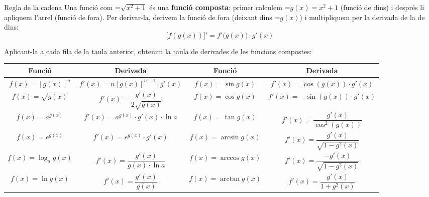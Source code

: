 \documentclass[11pt,a4paper]{article}
\newcommand{\fmm}[1]{\setbox0=\hbox{$#1$}\ifdim\wd0>\linewidth\[#1\]\else\mbox{\box0}\fi}
\begin{document}
  
\begin{fmdef}{Regla de la cadena}
Una funció com \fmm{\sqrt{x^2+1}} és una \textbf{funció composta}: primer calculem \fmm{g(x)=x^2+1} (funció de dins) i després li apliquem l'arrel (funció de fora). Per derivar-la, derivem la funció de fora (deixant dins \fmm{g(x)}) i multipliquem per la derivada de la de dins:    
\[\big[f(g(x))\big]'=f'\big(g(x)\big)\cdot g'(x)\]

    

Aplicant-la a cada fila de la taula anterior, obtenim la taula de derivades de les funcions compostes:

      
\begin{center}\renewcommand{\arraystretch}{1.5}\begin{tabular}{cccc}\toprule
\textbf{Funció} & \textbf{Derivada} & \textbf{Funció} & \textbf{Derivada}\\\midrule
$f(x)=[g(x)]^n$ & $f'(x)=n[g(x)]^{n-1}\cdot g'(x)$ & $f(x)=\sin g(x)$ & $f'(x)=\cos(g(x))\cdot g'(x)$\\
$f(x)=\sqrt{g(x)}$ & $f'(x)=\dfrac{g'(x)}{2\sqrt{g(x)}}$ & $f(x)=\cos g(x)$ & $f'(x)=-\sin(g(x))\cdot g'(x)$\\
$f(x)=a^{g(x)}$ & $f'(x)=a^{g(x)}\cdot g'(x)\cdot\ln a$ & $f(x)=\tan g(x)$ & $f'(x)=\dfrac{g'(x)}{\cos^2(g(x))}$\\[1ex]
$f(x)=e^{g(x)}$ & $f'(x)=e^{g(x)}\cdot g'(x)$ & $f(x)=\arcsin g(x)$ & $f'(x)=\dfrac{g'(x)}{\sqrt{1-g^2(x)}}$\\[1ex]
$f(x)=\log_a g(x)$ & $f'(x)=\dfrac{g'(x)}{g(x)\cdot\ln a}$ & $f(x)=\arccos g(x)$ & $f'(x)=\dfrac{-g'(x)}{\sqrt{1-g^2(x)}}$\\[1ex]
$f(x)=\ln g(x)$ & $f'(x)=\dfrac{g'(x)}{g(x)}$ & $f(x)=\arctan g(x)$ & $f'(x)=\dfrac{g'(x)}{1+g^2(x)}$\\[1ex]
\bottomrule\end{tabular}\end{center}
\end{fmdef}
\end{document}
